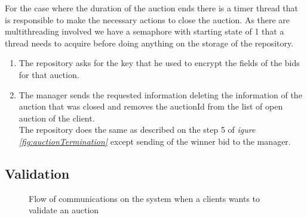 \documentclass[12pt]{article}
\begin{document}
For the case where the duration of the auction ends there is a timer thread that is responsible
  to make the necessary actions to close the auction. As there are multithreading involved
  we have a semaphore with starting state of 1 that a thread needs to acquire before doing anything
  on the storage of the repository.

\begin{enumerate}
    \item The repository asks for the key that he used to encrypt the fields of the
      bids for that auction.
    \item The manager sends the requested information deleting the information
      of the auction that was closed and removes the auctionId from the list of open auction of the 
      client. \\
      The repository does the same as described on the step 5 of \textit{igure \ref{fig:auctionTermination}} 
      except sending of the winner bid to the manager.

\end{enumerate}

\subsection{Validation}
\label{subsec:auctionValidation}



\begin{figure}[h]
  \caption{Flow of communications on the system when a clients wants to validate an auction}
  \label{fig:auctionValidation}
\end{figure}
\end{document}
